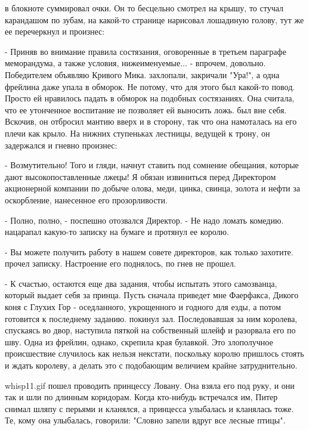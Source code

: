  в блокноте суммировал очки. Он то бесцельно смотрел на 
крышу, то стучал карандашом по зубам, на какой-то странице нарисовал 
лошадиную голову, тут же ее перечеркнул и произнес:
\par- Приняв во внимание правила состязания, оговоренные в третьем 
параграфе меморандума, а также условия, нижеименуемые... - впрочем, 
довольно. Победителем объявляю Кривого Мика.
 захлопали, закричали "Ура!", а одна фрейлина даже упала в 
обморок. Не потому, что для этого был какой-то повод. Просто ей 
нравилось падать в обморок на подобных состязаниях. Она считала, что 
ее утонченное воспитание не позволяет ей выносить ложь.
 был вне себя. Вскочив, он отбросил мантию вверх и в 
сторону, так что она намоталась на его плечи как крыло. На нижних 
ступеньках лестницы, ведущей к трону, он задержался и гневно произнес:
\par- Возмутительно! Того и гляди, начнут ставить под сомнение 
обещания, которые дают высокопоставленные лжецы! Я обязан извиниться 
перед Директором акционерной компании по добыче олова, меди, цинка, 
свинца, золота и нефти за оскорбление, нанесенное его прозорливости.
\par- Полно, полно, - поспешно отозвался Директор. - Не надо ломать 
комедию.
 нацарапал какую-то записку на бумаге и протянул ее королю.
\par- Вы можете получить работу в нашем совете директоров, как только 
захотите.
 прочел записку. Настроение его поднялось, по гнев не 
прошел.
\par- К счастью, остаются еще два задания, чтобы испытать этого 
самозванца, который выдает себя за принца. Пусть сначала приведет мне 
Фаерфакса, Дикого коня с Глухих Гор - оседланного, укрощенного и 
годного для езды, а потом готовится к последнему заданию.
 покинул зал. Последовавшая за ним королева, спускаясь во 
двор, наступила пяткой на собственный шлейф и разорвала его по шву. 
Одна из фрейлин, однако, скрепила края булавкой. Это злополучное 
происшествие случилось как нельзя некстати, поскольку королю пришлось 
стоять и ждать королеву, а делать это с подобающим величием крайне 
затруднительно.
\par{whisp11.gif}
 пошел проводить принцессу Ловану. Она взяла его под руку, и 
они так и шли по длинным коридорам. Когда кто-нибудь встречался им, 
Питер снимал шляпу с перьями и кланялся, а принцесса улыбалась и 
кланялась тоже. Те, кому она улыбалась, говорили: "Словно запели вдруг 
все лесные птицы".
